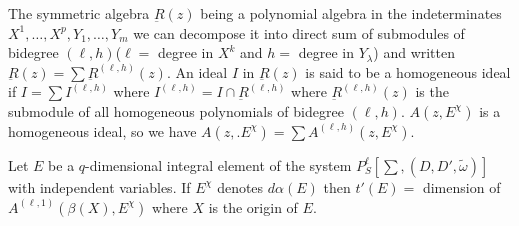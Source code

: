\begin{remark*}
  The symmetric algebra $\underbar{R}(z)$ being a polynomial algebra
  in the indeterminates $X^1, \ldots, X^p, Y_1, \ldots,Y_m$ we can
  decompose it into direct sum of submodules of bidegree $(\ell,
  h)$($\ell=$ degree in $X^k$ and $h=$ degree in $Y_{\lambda}$) and
  written $\underbar{R}(z) = \sum \underbar{R}^{(\ell , h)} (z)$. An
  ideal $I$ in $\underbar{R}(z)$ is said to be a homogeneous ideal if $I
  = \sum I ^{(\ell , h)}$ where $I^{(\ell, h)} = I \cap
  \underbar{R}^{(\ell, h)}$ where $\underbar{R}^{(\ell, h)}(z)$ is the
  submodule of all homogeneous polynomials of bidegree $(\ell ,h)$. $A
  (z,E^{\chi})$ is a homogeneous ideal, so we have  $A (z,. E^{\chi}) =
  \sum A^{(\ell , h)} (z,E^{\chi})$.	 
\end{remark*}

\begin{proposition}\label{chap3:sec3.9:prop13}%
  Let $E$ be a $q$-dimensional integral element of the system
  $P_S^{\ell}[\sum , (D,D',\tilde{\omega})]$ with independent
  variables. If $E^{\chi}$ denotes $d \alpha (E)$ then $t'(E)=$
  dimension of $A^{(\ell, 1)} (\beta (X) , E^{\chi})$ where $X$ is the
  origin of $E$. 
\end{proposition}


